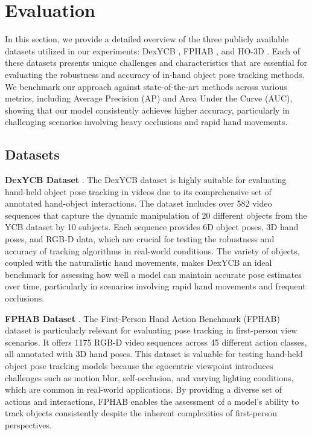\section{Evaluation}
\label{sec:Evaluation}

In this section, we provide a detailed overview of the three publicly available datasets utilized in our experiments: DexYCB \cite{chao2021dexycb}, FPHAB \cite{garcia2018first}, and HO-3D \cite{hampali2020honnotate}. Each of these datasets presents unique challenges and characteristics that are essential for evaluating the robustness and accuracy of in-hand object pose tracking methods. We benchmark our approach against state-of-the-art methods across various metrics, including Average Precision (AP) and Area Under the Curve (AUC), showing that our model consistently achieves higher accuracy, particularly in challenging scenarios involving heavy occlusions and rapid hand movements.

\subsection{Datasets}

\textbf{DexYCB Dataset} \cite{chao2021dexycb}. The DexYCB dataset is highly suitable for evaluating hand-held object pose tracking in videos due to its comprehensive set of annotated hand-object interactions. The dataset includes over 582 video sequences that capture the dynamic manipulation of 20 different objects from the YCB dataset by 10 subjects. Each sequence provides 6D object poses, 3D hand poses, and RGB-D data, which are crucial for testing the robustness and accuracy of tracking algorithms in real-world conditions. The variety of objects, coupled with the naturalistic hand movements, makes DexYCB an ideal benchmark for assessing how well a model can maintain accurate pose estimates over time, particularly in scenarios involving rapid hand movements and frequent occlusions. 

\noindent \textbf{FPHAB Dataset} \cite{garcia2018first}. The First-Person Hand Action Benchmark (FPHAB) dataset is particularly relevant for evaluating pose tracking in first-person view scenarios. It offers 1175 RGB-D video sequences across 45 different action classes, all annotated with 3D hand poses. This dataset is valuable for testing hand-held object pose tracking models because the egocentric viewpoint introduces challenges such as motion blur, self-occlusion, and varying lighting conditions, which are common in real-world applications. By providing a diverse set of actions and interactions, FPHAB enables the assessment of a model's ability to track objects consistently despite the inherent complexities of first-person perspectives. 

